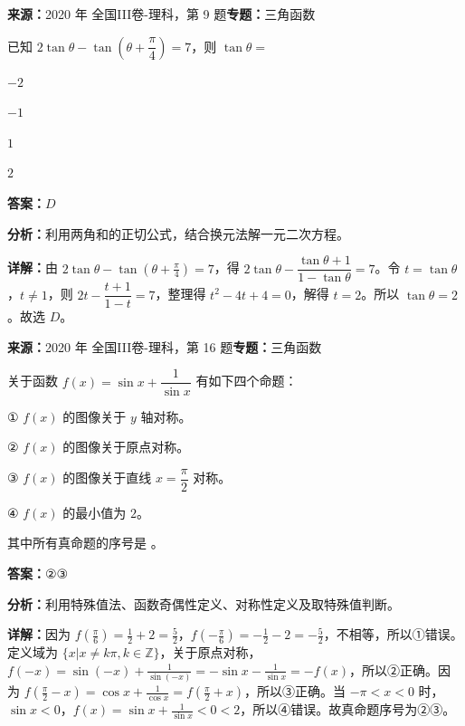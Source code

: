 \begin{question}[points=5]
\textbf{来源：}2020 年 全国III卷-理科，第 9 题\quad \textbf{专题：}三角函数\par
已知 $2\tan\theta-\tan\left(\theta+\dfrac{\pi}{4}\right)=7$，则 $\tan\theta=$
\begin{choices}
  \item $-2$
  \item $-1$
  \item $1$
  \item $2$
\end{choices}
\begin{solution}
\textbf{答案：}$D$

\textbf{分析：}利用两角和的正切公式，结合换元法解一元二次方程。

\textbf{详解：}由 $2\tan\theta-\tan(\theta+\frac{\pi}{4})=7$，得 $2\tan\theta-\dfrac{\tan\theta+1}{1-\tan\theta}=7$。令 $t=\tan\theta$，$t\neq1$，则 $2t-\dfrac{t+1}{1-t}=7$，整理得 $t^2-4t+4=0$，解得 $t=2$。所以 $\tan\theta=2$。故选 $D$。
\end{solution}
\end{question}

\begin{question}[points=5]
\textbf{来源：}2020 年 全国III卷-理科，第 16 题\quad \textbf{专题：}三角函数\par
关于函数 $f(x)=\sin x+\dfrac{1}{\sin x}$ 有如下四个命题：

① $f(x)$ 的图像关于 $y$ 轴对称。

② $f(x)$ 的图像关于原点对称。

③ $f(x)$ 的图像关于直线 $x=\dfrac{\pi}{2}$ 对称。

④ $f(x)$ 的最小值为 $2$。

其中所有真命题的序号是 。
\fillin[{$②③$}]
\begin{solution}
\textbf{答案：}$②③$

\textbf{分析：}利用特殊值法、函数奇偶性定义、对称性定义及取特殊值判断。

\textbf{详解：}因为 $f\left(\frac{\pi}{6}\right)=\frac12+2=\frac52$，$f\left(-\frac{\pi}{6}\right)=-\frac12-2=-\frac52$，不相等，所以①错误。定义域为 $\{x|x\neq k\pi,k\in\mathbb{Z}\}$，关于原点对称，$f(-x)=\sin(-x)+\frac{1}{\sin(-x)}=-\sin x-\frac{1}{\sin x}=-f(x)$，所以②正确。因为 $f\left(\frac{\pi}{2}-x\right)=\cos x+\frac{1}{\cos x}=f\left(\frac{\pi}{2}+x\right)$，所以③正确。当 $-\pi<x<0$ 时，$\sin x<0$，$f(x)=\sin x+\frac{1}{\sin x}<0<2$，所以④错误。故真命题序号为②③。
\end{solution}
\end{question}

